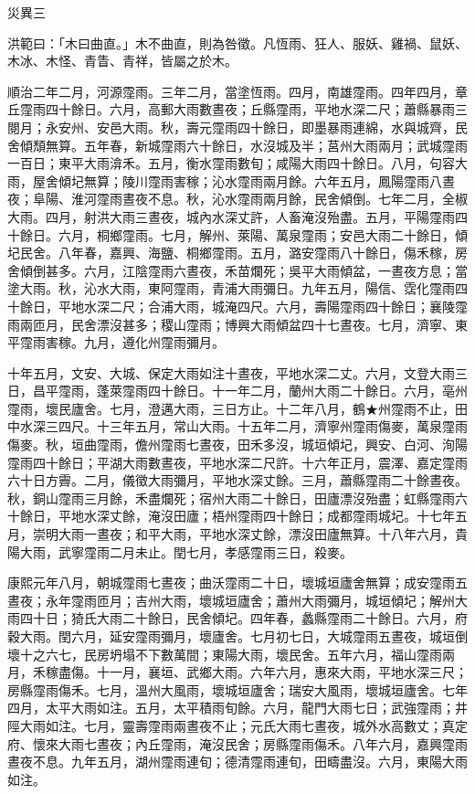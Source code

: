 
\begin{pinyinscope}
災異三

洪範曰：「木曰曲直。」木不曲直，則為咎徵。凡恆雨、狂人、服妖、雞禍、鼠妖、木冰、木怪、青眚、青祥，皆屬之於木。

順治二年二月，河源霪雨。三年二月，當塗恆雨。四月，南雄霪雨。四年四月，章丘霪雨四十餘日。六月，高郵大雨數晝夜；丘縣霪雨，平地水深二尺；蕭縣暴雨三閱月；永安州、安邑大雨。秋，壽元霪雨四十餘日，即墨暴雨連綿，水與城齊，民舍傾頹無算。五年春，新城霪雨六十餘日，水沒城及半；莒州大雨兩月；武城霪雨一百日；東平大雨渰禾。五月，衡水霪雨數旬；咸陽大雨四十餘日。八月，句容大雨，屋舍傾圮無算；陵川霪雨害稼；沁水霪雨兩月餘。六年五月，鳳陽霪雨八晝夜；阜陽、淮河霪雨晝夜不息。秋，沁水霪雨兩月餘，民舍傾倒。七年二月，全椒大雨。四月，射洪大雨三晝夜，城內水深丈許，人畜淹沒殆盡。五月，平陽霪雨四十餘日。六月，桐鄉霪雨。七月，解州、萊陽、萬泉霪雨；安邑大雨二十餘日，傾圮民舍。八年春，嘉興、海鹽、桐鄉霪雨。五月，潞安霪雨八十餘日，傷禾稼，房舍傾倒甚多。六月，江陰霪雨六晝夜，禾苗爛死；吳平大雨傾盆，一晝夜方息；當塗大雨。秋，沁水大雨，東阿霪雨，青浦大雨彌日。九年五月，陽信、霑化霪雨四十餘日，平地水深二尺；合浦大雨，城淹四尺。六月，壽陽霪雨四十餘日；襄陵霪雨兩匝月，民舍漂沒甚多；稷山霪雨；博興大雨傾盆四十七晝夜。七月，濟寧、東平霪雨害稼。九月，遵化州霪雨彌月。

十年五月，文安、大城、保定大雨如注十晝夜，平地水深二丈。六月，文登大雨三日，昌平霪雨，蓬萊霪雨四十餘日。十一年二月，蘭州大雨二十餘日。六月，亳州霪雨，壞民廬舍。七月，澄邁大雨，三日方止。十二年八月，鶴★州霪雨不止，田中水深三四尺。十三年五月，常山大雨。十五年二月，濟寧州霪雨傷麥，萬泉霪雨傷麥。秋，垣曲霪雨，儋州霪雨七晝夜，田禾多沒，城垣傾圮，興安、白河、洵陽霪雨四十餘日；平湖大雨數晝夜，平地水深二尺許。十六年正月，震澤、嘉定霪雨六十日方霽。二月，儀徵大雨彌月，平地水深丈餘。三月，蕭縣霪雨二十餘晝夜。秋，銅山霪雨三月餘，禾盡爛死；宿州大雨二十餘日，田廬漂沒殆盡；虹縣霪雨六十餘日，平地水深丈餘，淹沒田廬；梧州霪雨四十餘日；成都霪雨城圮。十七年五月，崇明大雨一晝夜；和平大雨，平地水深丈餘，漂沒田廬無算。十八年六月，貴陽大雨，武寧霪雨二月未止。閏七月，孝感霪雨三日，殺麥。

康熙元年八月，朝城霪雨七晝夜；曲沃霪雨二十日，壞城垣廬舍無算；成安霪雨五晝夜；永年霪雨匝月；吉州大雨，壞城垣廬舍；蕭州大雨彌月，城垣傾圮；解州大雨四十日；猗氏大雨二十餘日，民舍傾圮。四年春，蠡縣霪雨二十餘日。六月，府穀大雨。閏六月，延安霪雨彌月，壞廬舍。七月初七日，大城霪雨五晝夜，城垣倒壞十之六七，民房坍塌不下數萬間；東陽大雨，壞民舍。五年六月，福山霪雨兩月，禾稼盡傷。十一月，襄垣、武鄉大雨。六年六月，惠來大雨，平地水深三尺；房縣霪雨傷禾。七月，溫州大風雨，壞城垣廬舍；瑞安大風雨，壞城垣廬舍。七年四月，太平大雨如注。五月，太平積雨旬餘。六月，龍門大雨七日；武強霪雨；井陘大雨如注。七月，靈壽霪雨兩晝夜不止；元氏大雨七晝夜，城外水高數丈；真定府、懷來大雨七晝夜；內丘霪雨，淹沒民舍；房縣霪雨傷禾。八年六月，嘉興霪雨晝夜不息。九年五月，湖州霪雨連旬；德清霪雨連旬，田疇盡沒。六月，東陽大雨如注。


\end{pinyinscope}
